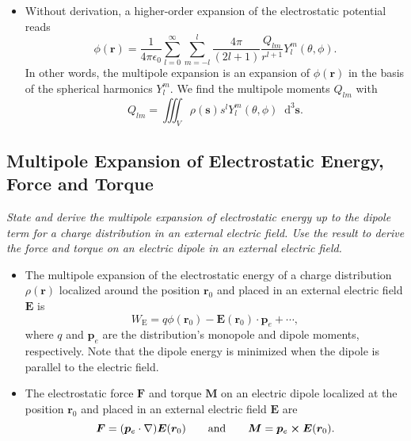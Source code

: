 \documentclass[11pt, a4paper]{article}
\newcommand{\diff}{\mathop{}\!\mathrm{d}} %
\renewcommand{\vec}[1]{\bm{#1}} %
\renewcommand{\r}{\vec{r}}
\newcommand{\E}{\vec{E}} %
\newcommand{\M}{\vec{M}}  %
\newcommand{\ee}{\epsilon_{0}}  %
\newcommand{\pe}{\vec{p}_{e}}  %
\newcommand{\s}{\vec{s}}  %
\newcommand{\ds}{\diff^{3} \s}  %
\renewcommand{\grad}{\nabla}
\begin{document}
\begin{itemize}
    
	
	\item Without derivation, a higher-order expansion of the electrostatic potential reads
	\begin{equation*}
		\phi(\r) = \frac{1}{4\pi \ee} \sum_{l=0}^{\infty}\sum_{m=-l}^{l}\frac{4\pi}{(2l+1)}\frac{Q_{lm}}{r^{l+1}}Y_{l}^{m}(\theta, \phi).
	\end{equation*}
	In other words, the multipole expansion is an expansion of $ \phi(\r) $ in the basis of the spherical harmonics $ Y_{l}^{m} $. We find the multipole moments $ Q_{lm} $ with
	\begin{equation*}
		Q_{lm} = \iiint_{V} \rho(\s)s^{l}Y_{l}^{m}(\theta, \phi) \ds.
	\end{equation*}
\end{itemize}

    
\subsection{Multipole Expansion of Electrostatic Energy, Force and Torque}
\textit{State and derive the multipole expansion of electrostatic energy up to the dipole term for a charge distribution in an external electric field. Use the result to derive the force and torque on an electric dipole in an external electric field.}

\begin{itemize}
    \item The multipole expansion of the electrostatic energy of a charge distribution $ \rho(\r) $ localized around the position $ \r_{0} $ and placed in an external electric field $ \E $ is
    \begin{equation*}
        W_{\text{E}} = q \phi(\r_{0}) - \E(\r_{0}) \cdot \pe + \cdots,
    \end{equation*}
    where $ q $ and $ \pe $ are the distribution's monopole and dipole moments, respectively. Note that the dipole energy is minimized when the dipole is parallel to the electric field.

    \item The electrostatic force $ \vec{F} $ and torque $ \vec{M} $ on an electric dipole localized at the position $ \r_{0} $ and placed in an external electric field $ \E $ are
    \begin{equation*}
        \vec{F} = (\pe \cdot \grad)\E(\r_{0}) \qquad \text{and} \qquad \M = \pe \cross \E(\r_{0}).
    \end{equation*}
    
\end{itemize}
\end{document}

